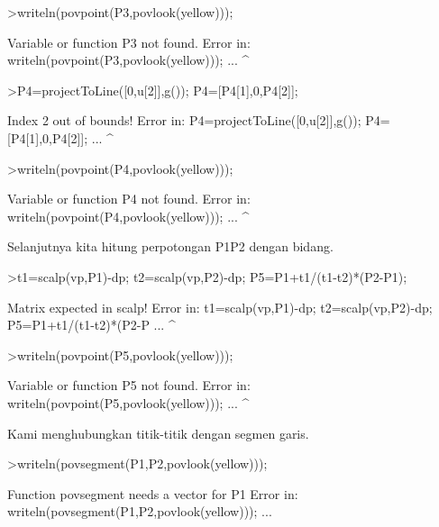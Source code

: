 \documentclass[a4paper,10pt]{article}
\begin{document}
\begin{eulernotebook}
\begin{eulercomment}
\begin{eulercomment}
\begin{eulercomment}
\begin{eulercomment}
\begin{eulercomment}
\begin{eulercomment}
\begin{eulercomment}
\begin{eulercomment}
\begin{eulercomment}
\begin{eulercomment}
\begin{eulercomment}
\begin{eulercomment}
\begin{eulercomment}
\begin{eulercomment}
\begin{eulercomment}
\begin{eulercomment}
\begin{eulerprompt}
>writeln(povpoint(P3,povlook(yellow)));
\end{eulerprompt}
\begin{euleroutput}
  Variable or function P3 not found.
  Error in:
  writeln(povpoint(P3,povlook(yellow))); ...
                     ^
\end{euleroutput}
\begin{eulerprompt}
>P4=projectToLine([0,u[2]],g()); P4=[P4[1],0,P4[2]];
\end{eulerprompt}
\begin{euleroutput}
  Index 2 out of bounds!
  Error in:
  P4=projectToLine([0,u[2]],g()); P4=[P4[1],0,P4[2]]; ...
                          ^
\end{euleroutput}
\begin{eulerprompt}
>writeln(povpoint(P4,povlook(yellow)));
\end{eulerprompt}
\begin{euleroutput}
  Variable or function P4 not found.
  Error in:
  writeln(povpoint(P4,povlook(yellow))); ...
                     ^
\end{euleroutput}
\begin{eulercomment}
Selanjutnya kita hitung perpotongan P1P2 dengan bidang.
\end{eulercomment}
\begin{eulerprompt}
>t1=scalp(vp,P1)-dp; t2=scalp(vp,P2)-dp; P5=P1+t1/(t1-t2)*(P2-P1);
\end{eulerprompt}
\begin{euleroutput}
  Matrix expected in scalp!
  Error in:
  t1=scalp(vp,P1)-dp; t2=scalp(vp,P2)-dp; P5=P1+t1/(t1-t2)*(P2-P ...
                 ^
\end{euleroutput}
\begin{eulerprompt}
>writeln(povpoint(P5,povlook(yellow)));
\end{eulerprompt}
\begin{euleroutput}
  Variable or function P5 not found.
  Error in:
  writeln(povpoint(P5,povlook(yellow))); ...
                     ^
\end{euleroutput}
\begin{eulercomment}
Kami menghubungkan titik-titik dengan segmen garis.
\end{eulercomment}
\begin{eulerprompt}
>writeln(povsegment(P1,P2,povlook(yellow)));
\end{eulerprompt}
\begin{euleroutput}
  Function povsegment needs a vector for P1
  Error in:
  writeln(povsegment(P1,P2,povlook(yellow))); ...

\end{euleroutput}
\end{eulercomment}
\end{eulercomment}
\end{eulercomment}
\end{eulercomment}
\end{eulercomment}
\end{eulercomment}
\end{eulercomment}
\end{eulercomment}
\end{eulercomment}
\end{eulercomment}
\end{eulercomment}
\end{eulercomment}
\end{eulercomment}
\end{eulercomment}
\end{eulercomment}
\end{eulercomment}
\end{eulernotebook}
\end{document}
